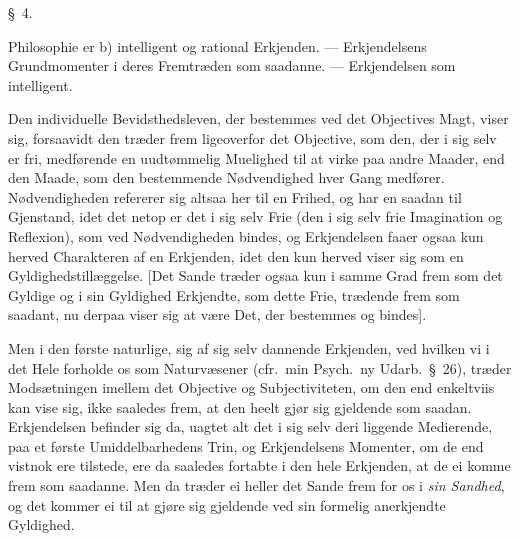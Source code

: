 \documentclass[12pt,a4paper]{book}
\begin{document}
\begin{center}\large\S~4.\end{center}
\begin{center}Philosophie er b) intelligent og rational Erkjenden. --- Erkjendelsens
Grundmomenter i deres Fremtræden som saadanne. --- Erkjendelsen som intelligent.\end{center}

Den individuelle Bevidsthedsleven, der bestemmes ved det Objectives Magt, viser
sig, forsaavidt den træder frem ligeoverfor det Objective, som den, der i sig
selv er fri, medførende en uudtømmelig Muelighed til at virke paa andre Maader,
end den Maade, som den bestemmende Nødvendighed hver Gang medfører.
Nødvendigheden refererer sig altsaa her til en Frihed, og har en saadan til
Gjenstand, idet det netop er det i sig selv Frie (den i sig selv frie Imagination
og Reflexion), som ved Nødvendigheden bindes, og Erkjendelsen faaer ogsaa kun
herved Charakteren af en Erkjenden, idet den kun herved viser sig som en
Gyldighedstillæggelse. [Det Sande træder ogsaa kun i samme Grad frem som det
Gyldige og i sin Gyldighed Erkjendte, som dette Frie, trædende frem som saadant,
nu derpaa viser sig at være Det, der bestemmes og bindes].

Men i den første naturlige, sig af sig selv dannende Erkjenden, ved hvilken vi i
det Hele forholde os som Naturvæsener (cfr.\ min Psych.\ ny Udarb.\ \S~26), træder
Modsætningen imellem det Objective og Subjectiviteten, om den end enkeltviis kan
vise sig, ikke saaledes frem, at den heelt gjør sig gjeldende som saadan.
Erkjendelsen befinder sig da, uagtet alt det i sig selv deri liggende Medierende,
paa et første Umiddelbarhedens Trin, og Erkjendelsens Momenter, om de end vistnok
ere tilstede, ere da saaledes fortabte i den hele Erkjenden, at de ei komme frem
som saadanne. Men da træder ei heller det Sande frem for os i \emph{sin Sandhed},
og det kommer ei til at gjøre sig gjeldende ved sin formelig anerkjendte
Gyldighed.
\end{document}
